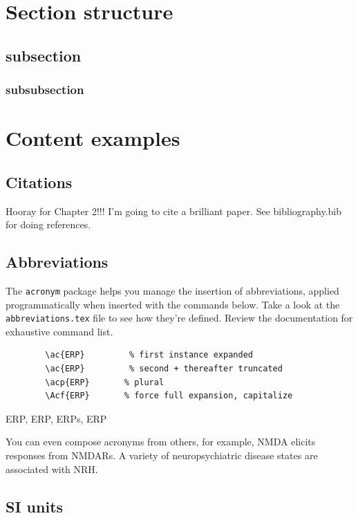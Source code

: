 \documentclass[../../main.tex]{subfiles}  %
\begin{document}
\section{Section structure}

	\subsection{subsection}

	\subsubsection{subsubsection}

\section{Content examples}

	\subsection{Citations}

	Hooray for Chapter 2!!! 
	I'm going to cite a brilliant paper\supercite{aartsSolutionDependencyUsing2014}. 
	See bibliography.bib for doing references.

	\subsection{Abbreviations}

	The \verb|acronym| package helps you manage the insertion of abbreviations, applied programmatically when inserted with the commands below. 
	Take a look at the \verb|abbreviations.tex| file to see how they're defined.
	Review the documentation for exhaustive command list.

	\begin{verbatim}
		\ac{ERP}		 % first instance expanded
		\ac{ERP}		 % second + thereafter truncated
		\acp{ERP}		% plural
		\Acf{ERP}		% force full expansion, capitalize
	  \end{verbatim}

	\ac{ERP}, \ac{ERP}, \acp{ERP}, \Acf{ERP}	

	You can even compose acronyms from others, for example, \ac{NMDA} elicits responses from \acp{NMDAR}. 
	A variety of neuropsychiatric disease states are associated with \ac{NRH}.

	\subsection{SI units}
\end{document}
